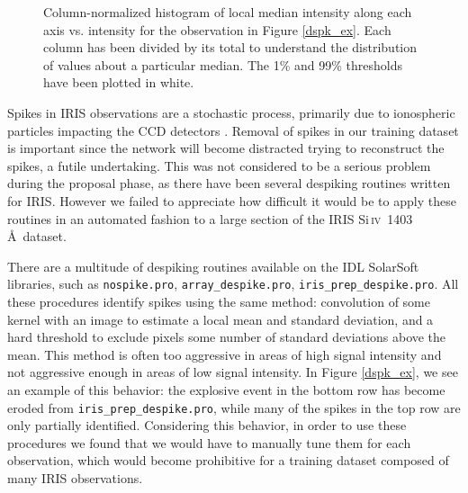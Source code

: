 \documentclass[10pt,letterpaper, doublespace]{article}
\newcommand{\SiIV}{Si\,\textsc{iv}~1403\,\AA}
\begin{document}
\begin{figure}[t!]
				\caption{Column-normalized histogram of local median intensity along each axis vs. intensity for the observation in Figure \ref{dspk_ex}.
					Each column has been divided by its total to understand the distribution of values about a particular median.
					The 1\% and 99\% thresholds have been plotted in white.
					}
				
				\label{dspk_hist}
				
			\end{figure}
			
			Spikes in IRIS observations are a stochastic process, primarily due to ionospheric particles impacting the CCD detectors \citep{itn15}.
			Removal of spikes in our training dataset is important since the network will become distracted trying to reconstruct the spikes, a futile undertaking.
			This was not considered to be a serious problem during the proposal phase, as there have been several despiking routines written for IRIS.
			However we failed to appreciate how difficult it would be to apply these routines in an automated fashion to a large section of the IRIS \SiIV\ dataset.
			
			There are a multitude of despiking routines available on the IDL SolarSoft libraries, such as \texttt{nospike.pro}, \texttt{array\_despike.pro}, \texttt{iris\_prep\_despike.pro}.
			All these procedures identify spikes using the same method: convolution of some kernel with an image to estimate a local mean and standard deviation, and a hard threshold to exclude pixels some number of standard deviations above the mean.
			This method is often too aggressive in areas of high signal intensity and not aggressive enough in areas of low signal intensity.
			In Figure \ref{dspk_ex}, we see an example of this behavior: the explosive event in the bottom row has become eroded from \texttt{iris\_prep\_despike.pro}, while many of the spikes in the top row are only partially identified.
			Considering this behavior, in order to use these procedures we found that we would have to manually tune them for each observation, which would become prohibitive for a training dataset composed of many IRIS observations.
			
\end{document}
